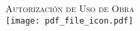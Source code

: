 
\newpage
\thispagestyle{empty}
\begin{center}

  \vspace*{\fill}


  \Large\textsc{Autorización de Uso de Obra}\\[0.2cm]
  \texttt{[image: pdf\_file\_icon.pdf]}

  \vspace*{\fill}

\end{center}
\cleardoublepage
